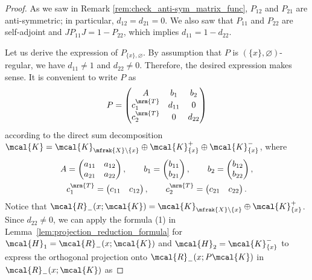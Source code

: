 \begin{proof}
As we saw in Remark \ref{rem:check_anti-sym_matrix_func}, $P_{12}$ and $P_{21}$ are anti-symmetric; in particular, $d_{12}=d_{21}=0$. We also saw that $P_{11}$ and $P_{22}$ are self-adjoint and $JP_{11}J=1-P_{22}$, which implies $d_{11}=1-d_{22}$.

Let us derive the expression of $P_{\{x\},\varnothing}$. By assumption that $P$ is $(\{x\},\varnothing)$-regular, we have $d_{11}\neq 1$ and $d_{22}\neq 0$. Therefore, the desired expression makes sense. It is convenient to write $P$ as
\begin{equation*}
	P=\left(
	\begin{matrix}
	A & b_{1} & b_{2} \\
	c_{1}^{\mrm{T}} & d_{11} & 0 \\
	c_{2}^{\mrm{T}} & 0 & d_{22}
	\end{matrix}
	\right)
\end{equation*}
according to the direct sum decomposition $\mcal{K}=\mcal{K}_{\mfrak{X}\backslash \{x\}}\oplus \mcal{K}_{\{x\}}^{+}\oplus \mcal{K}_{\{x\}}^{-}$, where
\begin{gather*}
	A =\left(
	\begin{matrix}
		a_{11} & a_{12} \\
		a_{21} & a_{22}
	\end{matrix}
	\right), \qquad
	b_{1} =\left(
	\begin{matrix}
		b_{11} \\
		b_{21}
	\end{matrix}
	\right), \qquad
	b_{2} =\left(
	\begin{matrix}
		b_{12} \\
		b_{22}
	\end{matrix}
	\right), \\
	c_{1}^{\mrm{T}} =\left(
	\begin{matrix}
		c_{11} & c_{12}
	\end{matrix}
	\right), \qquad
	c_{2}^{\mrm{T}} =\left(
	\begin{matrix}
		c_{21} & c_{22}
	\end{matrix}
	\right).
\end{gather*}
Notice that $\mcal{R}_{-}(x;\mcal{K})=\mcal{K}_{\mfrak{X}\backslash\{x\}}\oplus \mcal{K}_{\{x\}}^{+}$.
Since $d_{22}\neq 0$, we can apply the formula (1) in Lemma~\ref{lem:projection_reduction_formula} for $\mcal{H}_{1}=\mcal{R}_{-}(x;\mcal{K})$ and $\mcal{H}_{2}=\mcal{K}_{\{x\}}^{-}$ to express the orthogonal projection onto $\mcal{R}_{-}(x;P\mcal{K})$ in $\mcal{R}_{-}(x;\mcal{K})$ as

\end{proof}
